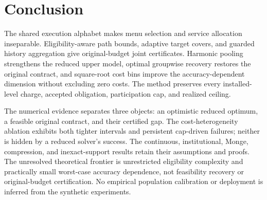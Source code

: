 \section{Conclusion}
The shared execution alphabet makes menu selection and service allocation inseparable. Eligibility-aware path bounds, adaptive target covers, and guarded history aggregation give original-budget joint certificates. Harmonic pooling strengthens the reduced upper model, optimal groupwise recovery restores the original contract, and square-root cost bins improve the accuracy-dependent dimension without excluding zero costs. The method preserves every installed-level charge, accepted obligation, participation cap, and realized ceiling.

The numerical evidence separates three objects: an optimistic reduced optimum, a feasible original contract, and their certified gap. The cost-heterogeneity ablation exhibits both tighter intervals and persistent cap-driven failures; neither is hidden by a reduced solver's success. The continuous, institutional, Monge, compression, and inexact-support results retain their assumptions and proofs. The unresolved theoretical frontier is unrestricted eligibility complexity and practically small worst-case accuracy dependence, not feasibility recovery or original-budget certification. No empirical population calibration or deployment is inferred from the synthetic experiments.
